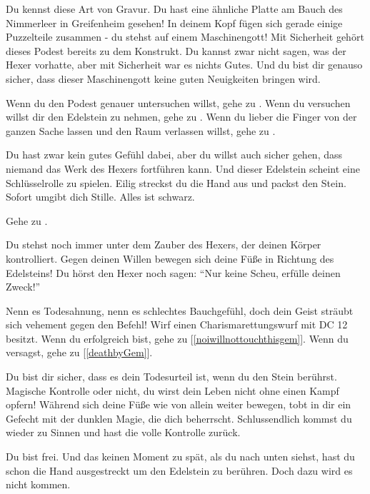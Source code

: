 
Du kennst diese Art von Gravur. Du hast eine ähnliche Platte am Bauch des Nimmerleer in Greifenheim gesehen! In deinem Kopf fügen sich gerade einige Puzzelteile zusammen - du stehst auf einem Maschinengott! Mit Sicherheit gehört dieses Podest bereits zu dem Konstrukt. Du kannst zwar nicht sagen, was der Hexer vorhatte, aber mit Sicherheit war es nichts Gutes. Und du bist dir genauso sicher, dass dieser Maschinengott keine guten Neuigkeiten bringen wird.

Wenn du den Podest genauer untersuchen willst, gehe zu .
Wenn du versuchen willst dir den Edelstein zu nehmen, gehe zu .
Wenn du lieber die Finger von der ganzen Sache lassen und den Raum verlassen willst, gehe zu .


Du hast zwar kein gutes Gefühl dabei, aber du willst auch sicher gehen, dass niemand das Werk des Hexers fortführen kann. Und dieser Edelstein scheint eine Schlüsselrolle zu spielen. Eilig streckst du die Hand aus und packst den Stein. Sofort umgibt dich Stille. Alles ist schwarz.

Gehe zu .


Du stehst noch immer unter dem Zauber des Hexers, der deinen Körper kontrolliert. Gegen deinen Willen bewegen sich deine Füße in Richtung des Edelsteins! Du hörst den Hexer noch sagen: ``Nur keine Scheu, erfülle deinen Zweck!''

Nenn es Todesahnung, nenn es schlechtes Bauchgefühl, doch dein Geist sträubt sich vehement gegen den Befehl! Wirf einen Charismarettungswurf mit DC 12 besitzt. Wenn du erfolgreich bist, gehe zu [\ref{noiwillnottouchthisgem}]. Wenn du versagst, gehe zu [\ref{deathbyGem}].


Du bist dir sicher, dass es dein Todesurteil ist, wenn du den Stein berührst. Magische Kontrolle oder nicht, du wirst dein Leben nicht ohne einen Kampf opfern! Während sich deine Füße wie von allein weiter bewegen, tobt in dir ein Gefecht mit der dunklen Magie, die dich beherrscht. Schlussendlich kommst du wieder zu Sinnen und hast die volle Kontrolle zurück.

Du bist frei. Und das keinen Moment zu spät, als du nach unten siehst, hast du schon die Hand ausgestreckt um den Edelstein zu berühren. Doch dazu wird es nicht kommen.

